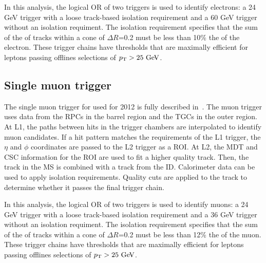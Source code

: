 In this analysis, the logical OR of two triggers is used to identify electrons: a 24 GeV trigger with a loose track-based isolation requirement and a 60 GeV trigger without an isolation requiment. The isolation requirement specifies that the sum of the \pt of tracks within a cone of $\Delta R$=0.2 must be less than 10\% the \pt of the electron. These trigger chains have thresholds that are maximally efficient for leptons passing offlines selections of $\pT > 25 \GeV$.

\subsection{Single muon trigger}

The single muon trigger for used for 2012 is fully described in~\cite{mutrig}. The muon trigger uses data from the RPCs in the barrel region and the TGCs in the outer region. At L1, the paths between hits in the trigger chambers are interpolated to identify muon candidates. If a hit pattern matches the requirements of the L1 trigger, the $\eta$ and $\phi$ coordinates are passed to the L2 trigger as a ROI. At L2, the MDT and CSC information for the ROI are used to fit a higher quality track. Then, the track in the MS is combined with a track from the ID. Calorimeter data can be used to apply isolation requirements. Quality cuts are applied to the track to determine whether it passes the final trigger chain.

In this analysis, the logical OR of two triggers is used to identify muons: a 24 GeV trigger with a loose track-based isolation requirement and a 36 GeV trigger without an isolation requiment. The isolation requirement specifies that the sum of the \pt of tracks within a cone of $\Delta R$=0.2 must be less than 12\% the \pt of the muon. These trigger chains have thresholds that are maximally efficient for leptons passing offlines selections of $\pT > 25 \GeV$.

